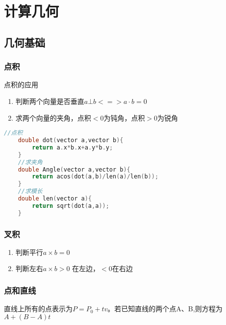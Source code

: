 \documentclass{article}
\begin{document}
\tableofcontents


\section{计算几何}
\label{sec:geometry}

\subsection{几何基础}
\label{sec:geometry_basic}
\subsubsection{点积}
\label{sec:dianji}
点积的应用  

\begin{enumerate}
\item 判断两个向量是否垂直$a\bot b <=> a·b = 0$
\item 求两个向量的夹角，点积$<0$为钝角，点积$>0$为锐角
\end{enumerate}

\begin{lstlisting}[language={c}]
    //点积
    double dot(vector a,vector b){
        return a.x*b.x+a.y*b.y;
    }
    //求夹角
    double Angle(vector a,vector b){
        return acos(dot(a,b)/len(a)/len(b));
    }
    //求模长
    double len(vector a){ 
        return sqrt(dot(a,a));
    }
\end{lstlisting}

\subsubsection{叉积}
\label{sec:chaji}

\begin{enumerate}
    \item 判断平行$a\times b = 0$
    \item 判断左右$a\times b > 0$ 在左边，$< 0$在右边
\end{enumerate}

\subsubsection{点和直线}

直线上所有的点表示为$P = P_0+tv$。若已知直线的两个点A、B,则方程为$A+(B-A)t$
\end{document}
